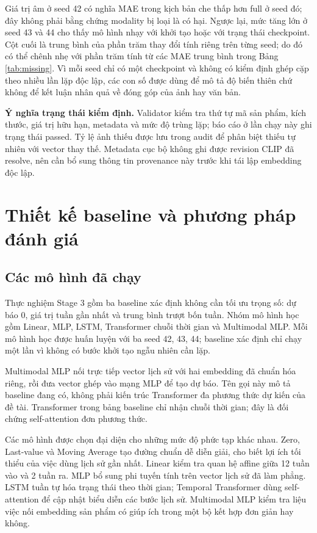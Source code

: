 \documentclass[12pt,a4paper,oneside]{article}
\begin{document}
Giá trị âm ở seed 42 có nghĩa MAE trong kịch bản che thấp hơn full ở seed đó; đây không phải bằng chứng modality bị loại là có hại. Ngược lại, mức tăng lớn ở seed 43 và 44 cho thấy mô hình nhạy với khởi tạo hoặc với trạng thái checkpoint. Cột cuối là trung bình của phần trăm thay đổi tính riêng trên từng seed; do đó có thể chênh nhẹ với phần trăm tính từ các MAE trung bình trong Bảng \ref{tab:missing}. Vì mỗi seed chỉ có một checkpoint và không có kiểm định ghép cặp theo nhiều lần lặp độc lập, các con số được dùng để mô tả độ biến thiên chứ không để kết luận nhân quả về đóng góp của ảnh hay văn bản.

\noindent\textbf{Ý nghĩa trạng thái kiểm định.} Validator kiểm tra thứ tự mã sản phẩm, kích thước, giá trị hữu hạn, metadata và mức độ trùng lặp; báo cáo ở lần chạy này ghi trạng thái passed. Tỷ lệ ảnh thiếu được lưu trong audit để phân biệt thiếu tự nhiên với vector thay thế. Metadata cục bộ không ghi được revision CLIP đã resolve, nên cần bổ sung thông tin provenance này trước khi tái lập embedding độc lập.

\section{Thiết kế baseline và phương pháp đánh giá}
\subsection{Các mô hình đã chạy}
Thực nghiệm Stage 3 gồm ba baseline xác định không cần tối ưu trọng số: dự báo 0, giá trị tuần gần nhất và trung bình trượt bốn tuần. Nhóm mô hình học gồm Linear, MLP, LSTM, Transformer chuỗi thời gian và Multimodal MLP. Mỗi mô hình học được huấn luyện với ba seed 42, 43, 44; baseline xác định chỉ chạy một lần vì không có bước khởi tạo ngẫu nhiên cần lặp.

Multimodal MLP nối trực tiếp vector lịch sử với hai embedding đã chuẩn hóa riêng, rồi đưa vector ghép vào mạng MLP để tạo dự báo. Tên gọi này mô tả baseline đang có, không phải kiến trúc Transformer đa phương thức dự kiến của đề tài. Transformer trong bảng baseline chỉ nhận chuỗi thời gian; đây là đối chứng self-attention đơn phương thức.

Các mô hình được chọn đại diện cho những mức độ phức tạp khác nhau. Zero, Last-value và Moving Average tạo đường chuẩn dễ diễn giải, cho biết lợi ích tối thiểu của việc dùng lịch sử gần nhất. Linear kiểm tra quan hệ affine giữa 12 tuần vào và 2 tuần ra. MLP bổ sung phi tuyến tính trên vector lịch sử đã làm phẳng. LSTM tuần tự hóa trạng thái theo thời gian; Temporal Transformer dùng self-attention để cập nhật biểu diễn các bước lịch sử. Multimodal MLP kiểm tra liệu việc nối embedding sản phẩm có giúp ích trong một bộ kết hợp đơn giản hay không.
\end{document}
